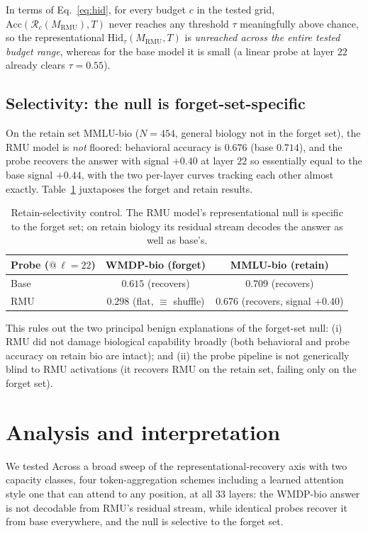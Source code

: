 \documentclass[11pt]{article}
\newcommand{\Hid}{\mathrm{Hid}}
\newcommand{\Acc}{\mathrm{Acc}}
\newcommand{\Rc}{\mathcal{R}}
\newcommand{\Mrmu}{M_{\mathrm{RMU}}}
\begin{document}
In terms of Eq.~\eqref{eq:hid}, for every budget $c$ in the tested grid,
$\Acc(\Rc_c(\Mrmu), T)$ never reaches any threshold $\tau$ meaningfully above chance, so the
representational $\Hid_\tau(\Mrmu, T)$ is \emph{unreached across the entire tested budget
range}, whereas for the base model it is small (a linear probe at layer $22$ already clears
$\tau=0.55$).
 
\subsection{Selectivity: the null is forget-set-specific}
On the retain set MMLU-bio ($N=454$, general biology not in the forget set), the RMU model
is \emph{not} floored: behavioral accuracy is $0.676$ (base $0.714$), and the probe recovers
the answer with signal $+0.40$ at layer $22$ so essentially equal to the base signal
$+0.44$, with the two per-layer curves tracking each other almost exactly. Table~\ref{tab:sel}
juxtaposes the forget and retain results.

 \begin{table}[h]
\centering
\small
\begin{tabular}{lcc}
\toprule
Probe ($@\,\ell{=}22$) & WMDP-bio (forget) & MMLU-bio (retain) \\
\midrule
Base & $0.615$ (recovers) & $0.709$ (recovers) \\
RMU  & $0.298$ (flat, $\equiv$ shuffle) & $0.676$ (recovers, signal $+0.40$) \\
\bottomrule
\end{tabular}
\caption{Retain-selectivity control. The RMU model's representational null is specific to
the forget set; on retain biology its residual stream decodes the answer as well as base's.}
\label{tab:sel}
\end{table}
 
This rules out the two principal benign explanations of the forget-set null:
(i) RMU did not damage biological capability broadly (both behavioral and probe accuracy on
retain bio are intact); and (ii) the probe pipeline is not generically blind to RMU
activations (it recovers RMU on the retain set, failing only on the forget set).

\section{Analysis and interpretation}
 We tested Across a broad sweep of the representational-recovery axis with two capacity classes, four
token-aggregation schemes including a learned attention style one that can attend to any position, at all
$33$ layers: the WMDP-bio answer is not decodable from RMU's residual stream, while
identical probes recover it from base everywhere, and the null is selective to the forget
set. 
\end{document}
